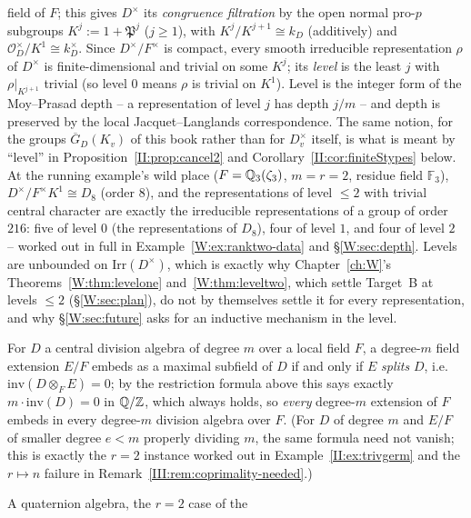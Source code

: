 \begin{description}
field of $F$; this gives $D^\times$ its \emph{congruence filtration}
by the open normal pro-$p$ subgroups $K^j:=1+\mathfrak P^j$ ($j\ge1$), with
$K^j/K^{j+1}\cong k_D$ (additively) and $\mathcal O_D^\times/K^1\cong
k_D^\times$. Since $D^\times/F^\times$ is compact, every smooth
irreducible representation $\rho$ of $D^\times$ is finite-dimensional
and trivial on some $K^j$; its \emph{level} is the least $j$ with
$\rho|_{K^{j+1}}$ trivial (so level $0$ means $\rho$ is trivial on
$K^1$). Level is the integer form of the Moy--Prasad depth -- a
representation of level $j$ has depth $j/m$ -- and depth is preserved
by the local Jacquet--Langlands correspondence. The same notion, for
the groups $\overline G_D(K_v)$ of this book rather than for $D_v^\times$
itself, is what is meant by ``level'' in
Proposition~\ref{II:prop:cancel2} and Corollary~\ref{II:cor:finiteStypes} below. At the running example's wild place
($F=\mathbb{Q}_3(\zeta_3)$, $m=r=2$, residue field $\mathbb F_3$), $D^\times/F^\times
K^1\cong D_8$ (order $8$), and the representations of level $\le2$
with trivial central character are exactly the irreducible
representations of a group of order $216$: five of level $0$ (the
representations of $D_8$), four of level $1$, and four of level $2$
-- worked out in full in Example~\ref{W:ex:ranktwo-data} and
\S\ref{W:sec:depth}. Levels are unbounded on $\mathrm{Irr}(D^\times)$,
which is exactly why Chapter~\ref{ch:W}'s Theorems~\ref{W:thm:levelone}
and~\ref{W:thm:leveltwo}, which settle Target~B at levels $\le2$
(\S\ref{W:sec:plan}), do not by themselves settle it for every
representation, and why \S\ref{W:sec:future} asks for an inductive
mechanism in the level.
\item[Embedding criterion] For $D$ a central division algebra of
degree $m$ over a local field $F$, a degree-$m$ field extension
$E/F$ embeds as a maximal subfield of $D$ if and only if $E$
\emph{splits} $D$, i.e.\ $\mathrm{inv}(D\otimes_FE)=0$; by the
restriction formula above this says exactly $m\cdot\mathrm{inv}(D)=0$
in $\mathbb{Q}/\mathbb Z$, which always holds, so \emph{every} degree-$m$ extension
of $F$ embeds in every degree-$m$ division algebra over $F$. (For $D$ of degree
$m$ and $E/F$ of smaller degree $e<m$ properly dividing $m$, the same
formula need not vanish; this is exactly the $r=2$ instance worked
out in Example~\ref{II:ex:trivgerm} and the $r\mapsto n$ failure in
Remark~\ref{III:rem:coprimality-needed}.)
\item[Quaternion algebras, Hilbert symbols] A quaternion algebra, the $r=2$ case of the

\end{description}
